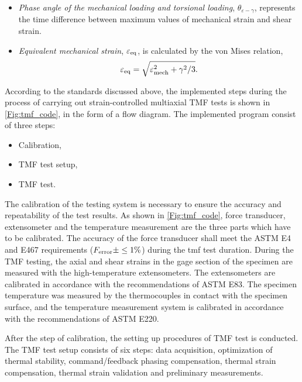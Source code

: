 \begin{itemize}
  \item {\em Phase angle of the mechanical loading and torsional loading}, $\theta_{\varepsilon-\gamma}$, represents the time difference between maximum values of mechanical strain and shear strain.
  \item {\em Equivalent mechanical strain}, $\varepsilon_{\rm{eq}}$, is calculated by the von Mises relation\cite{Pol1991Cyclic},
  \begin{equation}
  \varepsilon_{\rm{eq}}=\sqrt {\varepsilon_{\rm{mech}}^2 + {\gamma ^2}/3}.
  \end{equation}
\end{itemize}

According to the standards discussed above, the implemented steps during the process of carrying out strain-controlled multiaxial TMF tests is shown in \ref{Fig:tmf_code}, in the form of a flow diagram.
The implemented program consist of three steps:
\begin{itemize}
  \item Calibration,
  \item TMF test setup,
  \item TMF test.
\end{itemize}

The calibration of the testing system is necessary to ensure the accuracy and repeatability of the test results.
As shown in \ref{Fig:tmf_code}, force transducer, extensometer and the temperature measurement are the three parts which have to be calibrated.
The accuracy of the force transducer shall meet the ASTM E4 and E467 requirements ($F_{\rm error}\pm \leq 1\%$) during the tmf test duration.
During the TMF testing, the axial and shear strains in the gage section of the specimen are measured with the high-temperature extensometers.
The extensometers are calibrated in accordance with the recommendations of ASTM E83.
The specimen temperature was measured by the thermocouples in contact with the specimen surface, and the temperature measurement system is calibrated in accordance with the recommendations of ASTM E220.

After the step of calibration, the setting up procedures of TMF test is conducted.
The TMF test setup consists of six steps: data acquisition, optimization of thermal stability, command/feedback phasing compensation, thermal strain compensation, thermal strain validation and preliminary measurements.

